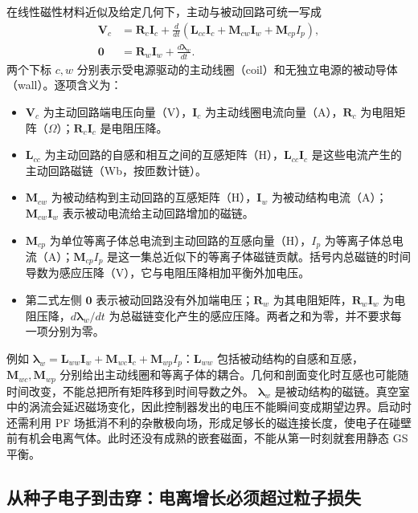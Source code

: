 \documentclass[12pt,fontset=none]{ctexart}
\numberwithin{equation}{section}
\numberwithin{table}{section}
\numberwithin{figure}{section}
\begin{document}
在线性磁性材料近似及给定几何下，主动与被动回路可统一写成
\begin{equation}\label{eq:cycle-coils}
 \begin{aligned}
 \bm V_c&=\bm R_c\bm I_c+
 \frac{d}{dt}(\bm L_{cc}\bm I_c+\bm M_{cw}\bm I_w+\bm M_{cp}I_p),\\
 \bm 0&=\bm R_w\bm I_w+\frac{d\bm\lambda_w}{dt}.
 \end{aligned}
\end{equation}
两个下标 $c,w$ 分别表示受电源驱动的主动线圈（coil）和无独立电源的被动导体（wall）。逐项含义为：
\begin{itemize}[nosep]
 \item $\bm V_c$ 为主动回路端电压向量（V），$\bm I_c$ 为主动线圈电流向量（A），$\bm R_c$ 为电阻矩阵（$\Omega$）；$\bm R_c\bm I_c$ 是电阻压降。
 \item $\bm L_{cc}$ 为主动回路的自感和相互之间的互感矩阵（H），$\bm L_{cc}\bm I_c$ 是这些电流产生的主动回路磁链（Wb，按匝数计链）。
 \item $\bm M_{cw}$ 为被动结构到主动回路的互感矩阵（H），$\bm I_w$ 为被动结构电流（A）；$\bm M_{cw}\bm I_w$ 表示被动电流给主动回路增加的磁链。
 \item $\bm M_{cp}$ 为单位等离子体总电流到主动回路的互感向量（H），$I_p$ 为等离子体总电流（A）；$\bm M_{cp}I_p$ 是这一集总近似下的等离子体磁链贡献。括号内总磁链的时间导数为感应压降（V），它与电阻压降相加平衡外加电压。
 \item 第二式左侧 $\bm0$ 表示被动回路没有外加端电压；$\bm R_w$ 为其电阻矩阵，$\bm R_w\bm I_w$ 为电阻压降，$d\bm\lambda_w/dt$ 为总磁链变化产生的感应压降。两者之和为零，并不要求每一项分别为零。
\end{itemize}
例如 $\bm\lambda_w=\bm L_{ww}\bm I_w+\bm M_{wc}\bm I_c+\bm M_{wp}I_p$：$\bm L_{ww}$ 包括被动结构的自感和互感，$\bm M_{wc},\bm M_{wp}$ 分别给出主动线圈和等离子体的耦合。几何和剖面变化时互感也可能随时间改变，不能总把所有矩阵移到时间导数之外。
$\bm\lambda_w$ 是被动结构的磁链。真空室中的涡流会延迟磁场变化，因此控制器发出的电压不能瞬间变成期望边界。启动时还需利用 PF 场抵消不利的杂散极向场，形成足够长的磁连接长度，使电子在碰壁前有机会电离气体。此时还没有成熟的嵌套磁面，不能从第一时刻就套用静态 GS 平衡。

\subsection{从种子电子到击穿：电离增长必须超过粒子损失}\label{sec:cycle-breakdown}
\end{document}

